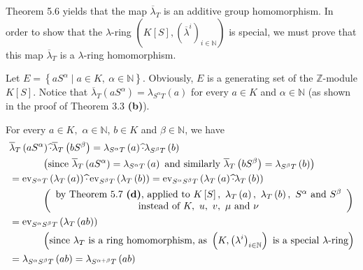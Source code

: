 \documentclass[numbers=enddot,12pt,final,onecolumn,notitlepage]{scrartcl}%
\begin{document}
Theorem 5.6 yields that the map $\overline{\lambda}_{T}$ is an additive group
homomorphism. In order to show that the $\lambda$-ring $\left(  K\left[
S\right]  ,\left(  \overline{\lambda}^{i}\right)  _{i\in\mathbb{N}}\right)  $
is special, we must prove that this map $\overline{\lambda}_{T}$ is a
$\lambda$-ring homomorphism.

Let $E=\left\{  aS^{\alpha}\mid a\in K,\ \alpha\in\mathbb{N}\right\}  $.
Obviously, $E$ is a generating set of the $\mathbb{Z}$-module $K\left[
S\right]  $. Notice that $\overline{\lambda}_{T}\left(  aS^{\alpha}\right)
=\lambda_{S^{\alpha}T}\left(  a\right)  $ for every $a\in K$ and $\alpha
\in\mathbb{N}$ (as shown in the proof of Theorem 3.3 \textbf{(b)}).

For every $a\in K,$ $\alpha\in\mathbb{N}$, $b\in K$ and $\beta\in\mathbb{N}$,
we have%
\begin{align*}
&  \overline{\lambda}_{T}\left(  aS^{\alpha}\right)  \widehat{\cdot}%
\overline{\lambda}_{T}\left(  bS^{\beta}\right)  =\lambda_{S^{\alpha}T}\left(
a\right)  \widehat{\cdot}\lambda_{S^{\beta}T}\left(  b\right) \\
&  \ \ \ \ \ \ \ \ \ \ \left(  \text{since }\overline{\lambda}_{T}\left(
aS^{\alpha}\right)  =\lambda_{S^{\alpha}T}\left(  a\right)  \text{ and
similarly }\overline{\lambda}_{T}\left(  bS^{\beta}\right)  =\lambda
_{S^{\beta}T}\left(  b\right)  \right) \\
&  =\operatorname*{ev}\nolimits_{S^{\alpha}T}\left(  \lambda_{T}\left(
a\right)  \right)  \widehat{\cdot}\operatorname*{ev}\nolimits_{S^{\beta}%
T}\left(  \lambda_{T}\left(  b\right)  \right)  =\operatorname*{ev}%
\nolimits_{S^{\alpha}S^{\beta}T}\left(  \lambda_{T}\left(  a\right)
\widehat{\cdot}\lambda_{T}\left(  b\right)  \right) \\
&  \ \ \ \ \ \ \ \ \ \ \left(
\begin{array}
[c]{c}%
\text{by Theorem 5.7 \textbf{(d)}, applied to }K\left[  S\right]  ,\text{
}\lambda_{T}\left(  a\right)  ,\text{ }\lambda_{T}\left(  b\right)  ,\text{
}S^{\alpha}\text{ and }S^{\beta}\\
\text{instead of }K,\text{ }u,\text{ }v,\text{ }\mu\text{ and }\nu
\end{array}
\right) \\
&  =\operatorname*{ev}\nolimits_{S^{\alpha}S^{\beta}T}\left(  \lambda
_{T}\left(  ab\right)  \right) \\
&  \ \ \ \ \ \ \ \ \ \ \left(  \text{since }\lambda_{T}\text{ is a ring
homomorphism, as }\left(  K,\left(  \lambda^{i}\right)  _{i\in\mathbb{N}%
}\right)  \text{ is a special }\lambda\text{-ring}\right) \\
&  =\lambda_{S^{\alpha}S^{\beta}T}\left(  ab\right)  =\lambda_{S^{\alpha
+\beta}T}\left(  ab\right)
\end{align*}
\end{document}
